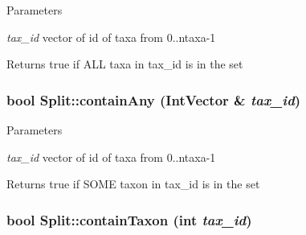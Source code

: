 \begin{DoxyParams}{Parameters}
\item[{\em tax\_\-id}]vector of id of taxa from 0..ntaxa-\/1 \end{DoxyParams}
\begin{DoxyReturn}{Returns}
true if ALL taxa in tax\_\-id is in the set 
\end{DoxyReturn}
\hypertarget{classSplit_afffa3f41c2edcf5c66e8875a8151941d}{
\subsubsection[{containAny}]{\setlength{\rightskip}{0pt plus 5cm}bool Split::containAny (IntVector \& {\em tax\_\-id})}}
\label{classSplit_afffa3f41c2edcf5c66e8875a8151941d}

\begin{DoxyParams}{Parameters}
\item[{\em tax\_\-id}]vector of id of taxa from 0..ntaxa-\/1 \end{DoxyParams}
\begin{DoxyReturn}{Returns}
true if SOME taxon in tax\_\-id is in the set 
\end{DoxyReturn}
\hypertarget{classSplit_a080cf81fd05ba6487dfd9130b8b9787b}{
\subsubsection[{containTaxon}]{\setlength{\rightskip}{0pt plus 5cm}bool Split::containTaxon (int {\em tax\_\-id})}}
\label{classSplit_a080cf81fd05ba6487dfd9130b8b9787b}

